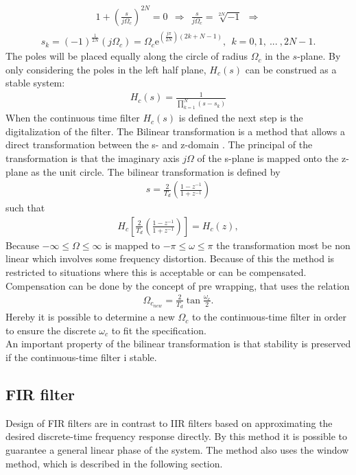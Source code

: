 \begin{align}
1+\left( \frac{s}{j\Omega_c}\right)^{2N} = 0 \ \  \Rightarrow  \ \ \frac{s}{j \Omega_c} = \sqrt[2N]{-1} \ \
\Rightarrow 
\end{align}
\begin{align}
s_k = (-1)^{\frac{1}{2N}}\left(j\Omega_c\right)=\Omega_c\text{e}^{\left(\frac{j\pi}{2N}\right)\left(2k+N-1\right)}, \ \ k=0,1,\ ... \ , 2N-1.
\end{align}   
The poles will be placed equally along the circle of radius $\Omega_c$ in the $s$-plane. By only considering the poles in the left half plane, $H_c(s)$ can be construed as a stable system:
\begin{align}
H_c(s)=\frac{1}{\prod_{k=1}^{N}(s-s_k)}
\end{align}    
When the continuous time filter $H_c(s)$ is defined the next step is the digitalization of the filter.  The Bilinear transformation is a method that allows a direct transformation between the s- and z-domain . The principal of the transformation is that the imaginary axis $j\Omega$ of the s-plane is mapped onto the z-plane as the unit circle. The bilinear transformation is defined by 
\begin{align}
s=\frac{2}{T_d}\left(\frac{1-z^{-1}}{1+z^{-1}}\right) 
\end{align}
such that 
\begin{align}
H_c\left[\frac{2}{T_d}\left(\frac{1-z^{-1}}{1+z^{-1}}\right)\right]=H_c(z), 
\end{align}  
Because $-\infty \leq \Omega \leq \infty $ is mapped to $-\pi \leq \omega \leq \pi$ the transformation most be non linear which involves some frequency distortion. Because of this the method is restricted to situations where this is acceptable or can be compensated. Compensation can be done by the concept of pre wrapping, that uses the relation 
\begin{align}
\Omega_{c_{new}}=\frac{2}{T_d}\tan\frac{\omega_c}{2}.
\end{align}
Hereby it is possible to determine a new $\Omega_c$ to the continuous-time filter in order to ensure the discrete $\omega_c$ to fit the specification.\\
An important property of the bilinear transformation is that stability is preserved if the continuous-time filter i stable.
\subsection{FIR filter}\label{subsec:FIR}
Design of FIR filters are in contrast to IIR filters based on approximating the desired discrete-time frequency response directly. By this method it is possible to guarantee a general linear phase of the system. The method also uses the window method, which is described in the following section.
